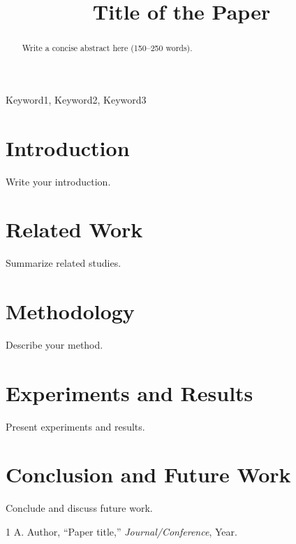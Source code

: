 \documentclass[conference]{IEEEtran}
\title{Title of the Paper}
\author{
\IEEEauthorblockN{Author Name}
\IEEEauthorblockA{Department, University\\
City, Country\\
email@domain.com}
}
\begin{document}
\maketitle

\begin{abstract}
Write a concise abstract here (150--250 words).
\end{abstract}

\begin{IEEEkeywords}
Keyword1, Keyword2, Keyword3
\end{IEEEkeywords}

\section{Introduction}
Write your introduction.

\section{Related Work}
Summarize related studies.

\section{Methodology}
Describe your method.

\section{Experiments and Results}
Present experiments and results.

\section{Conclusion and Future Work}
Conclude and discuss future work.


\begin{thebibliography}{1}
 A. Author, ``Paper title,'' \emph{Journal/Conference}, Year.
\end{thebibliography}
\end{document}
